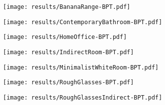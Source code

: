 \documentclass[varwidth=\maxdimen]{standalone}
\begin{document}
\texttt{[image: results/BananaRange-BPT.pdf]}

\texttt{[image: results/ContemporaryBathroom-BPT.pdf]}

\texttt{[image: results/HomeOffice-BPT.pdf]}

\texttt{[image: results/IndirectRoom-BPT.pdf]}

\texttt{[image: results/MinimalistWhiteRoom-BPT.pdf]}

\texttt{[image: results/RoughGlasses-BPT.pdf]}

\texttt{[image: results/RoughGlassesIndirect-BPT.pdf]}
\end{document}
